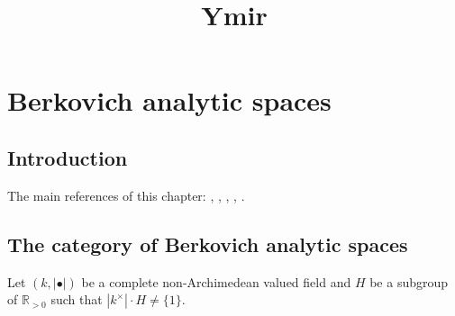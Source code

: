 
\title{Ymir}

\maketitle
\tableofcontents

\chapter*{Berkovich analytic spaces}\label{chap-Berkovich}

\section{Introduction}\label{sec-introduction}


The main references of this chapter: \cite{Berk93}, \cite{Berk12}, \cite{Tem04}, \cite{Tem00}, \cite{Duc18}.


\section{The category of Berkovich analytic spaces}
Let $(k,|\bullet|)$ be a complete non-Archimedean valued field and $H$ be a subgroup of $\mathbb{R}_{>0}$ such that $|k^{\times}|\cdot H\neq \{1\}$.
 
